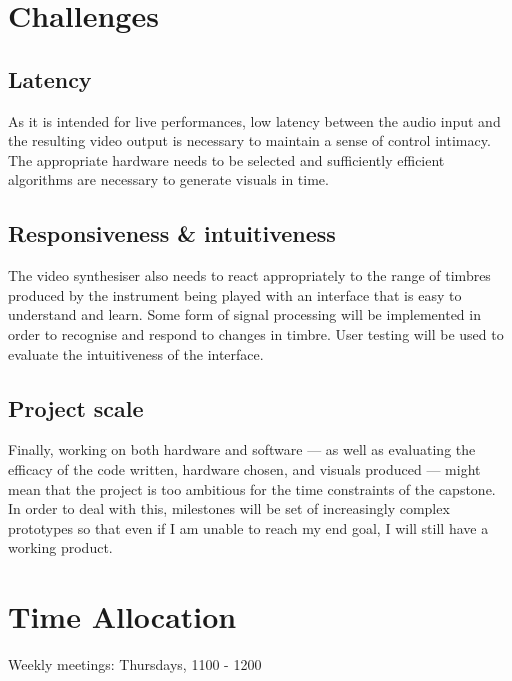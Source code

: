 \documentclass{article}
\begin{document}
\section{Challenges}
	\subsection{Latency}
		As it is intended for live performances, low latency between the audio input and the resulting video output is necessary to maintain a sense of control intimacy. The appropriate hardware needs to be selected and sufficiently efficient algorithms are necessary to generate visuals in time. 
	\subsection{Responsiveness \& intuitiveness}
		The video synthesiser also needs to react appropriately to the range of timbres produced by the instrument being played with an interface that is easy to understand and learn. Some form of signal processing will be implemented in order to recognise and respond to changes in timbre. User testing will be used to evaluate the intuitiveness of the interface. 
	\subsection{Project scale}
		Finally, working on both hardware and software --- as well as evaluating the efficacy of the code written, hardware chosen, and visuals produced --- might mean that the project is too ambitious for the time constraints of the capstone. In order to deal with this, milestones will be set of increasingly complex prototypes so that even if I am unable to reach my end goal, I will still have a working product.

\section{Time Allocation}
Weekly meetings: Thursdays, 1100 - 1200
\end{document}
